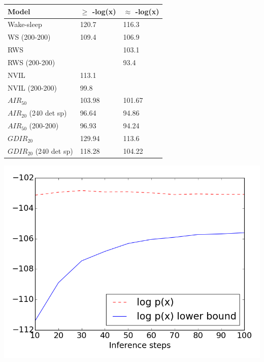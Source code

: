 \documentclass{article} %
\begin{document}
\begin{minipage}{\textwidth}
    \begin{minipage}[l]{0.5\textwidth}

\begin{tabular}{ | m{8.7em} | m{1.4cm}| m{1.4cm} | } 
\hline
Model & $\ge$ -log(x) & $\approx$ -log(x) \\ 
\hline
\hline
Wake-sleep & 120.7 & 116.3 \\ 
WS (200-200) & 109.4 & 106.9 \\
RWS & & 103.1 \\
RWS (200-200) & & 93.4 \\
\hline
NVIL & 113.1 &  \\
NVIL (200-200) & 99.8 & \\ 
\hline
$AIR_{50}$ & 103.98 & 101.67 \\
$AIR_{20}$ (240 det sp) & 96.64 & 94.86 \\
$AIR_{50}$ (200-200) & 96.93 & 94.24 \\
\hline
$GDIR_{20}$ & 129.94 & 113.6 \\
$GDIR_{20}$ (240 det sp) & 118.28  & 104.22 \\
\hline
\end{tabular}
\label{table:binary}

\end{minipage}
    \hspace{0.05\textwidth}
    \begin{minipage}[r]{0.43\textwidth}

\includegraphics[scale=0.3]{figures/binary_eval}
\label{fig:binary}
        \end{minipage}
\end{minipage}
\end{document}
